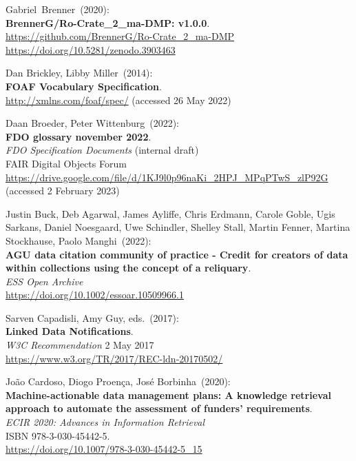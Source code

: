 \begin{thebibliography}{9}
Gabriel~Brenner~(2020): \\
\textbf{BrennerG/Ro-Crate\_2\_ma-DMP: v1.0.0}.\\
\url{https://github.com/BrennerG/Ro-Crate_2_ma-DMP}\\
\url{https://doi.org/10.5281/zenodo.3903463}

Dan Brickley, Libby Miller~(2014): \\
\textbf{FOAF Vocabulary Specification}.\\
\url{http://xmlns.com/foaf/spec/} (accessed 26 May 2022)

Daan Broeder, Peter Wittenburg~(2022): \\
\textbf{{FDO} glossary november 2022}.\\
\emph{FDO Specification Documents} (internal draft)\\
FAIR Digital Objects Forum\\
\url{https://drive.google.com/file/d/1KJ9l0p96naKi_2HPJ_MPqPTwS_zlP92G}
(accessed 2 February 2023)

Justin Buck, Deb Agarwal, James Ayliffe, Chris Erdmann, Carole Goble, Ugis Sarkans, Daniel Noesgaard, Uwe Schindler, Shelley Stall, Martin Fenner, Martina Stockhause, Paolo Manghi~(2022): \\
\textbf{AGU data citation community of practice - Credit for creators of data within collections using the concept of a reliquary}.\\ 
\emph{ESS Open Archive}\\
\url{https://doi.org/10.1002/essoar.10509966.1}


Sarven Capadisli, Amy Guy, eds.~(2017): \\
\textbf{Linked Data Notifications}.\\
\emph{W3C Recommendation} 2 May 2017 \\
\url{https://www.w3.org/TR/2017/REC-ldn-20170502/}

João Cardoso, Diogo Proença, José Borbinha~(2020): \\
\textbf{Machine-actionable data management plans: A knowledge retrieval
approach to automate the assessment of funders' requirements}.\\
\emph{ECIR 2020: Advances in Information Retrieval}\\
ISBN 978-3-030-45442-5.\\
\url{https://doi.org/10.1007/978-3-030-45442-5_15}


\end{thebibliography}
